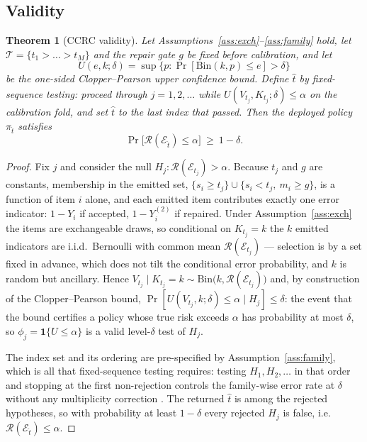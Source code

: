 \documentclass[review,number,doubleblind]{elsarticle}
\theoremstyle{plain}
\newtheorem{theorem}{Theorem}
\theoremstyle{definition}
\theoremstyle{remark}
\newcommand{\Risk}{\mathcal{R}}
\newcommand{\emit}{\mathcal{E}}
\begin{document}
\subsection{Validity}
\label{sec:validity}

\begin{theorem}[CCRC validity]
\label{thm:validity}
Let Assumptions~\ref{ass:exch}--\ref{ass:family} hold, let $\mathcal{T}=\{t_1>\dots>t_M\}$
and the repair gate $g$ be fixed before calibration, and let
\[
U(e,k;\delta)=\sup\{p:\Pr[\mathrm{Bin}(k,p)\le e]>\delta\}
\]
be the one-sided Clopper--Pearson upper confidence bound. Define
$\hat t$ by fixed-sequence testing: proceed through $j=1,2,\dots$ while
$U(V_{t_j},K_{t_j};\delta)\le\alpha$ on the calibration fold, and set
$\hat t$ to the last index that passed. Then the deployed policy
$\pi_{\hat t}$ satisfies
\[
\Pr\bigl[\Risk(\emit_{\hat t})\le\alpha\bigr]\ \ge\ 1-\delta .
\]
\end{theorem}

\begin{proof}
Fix $j$ and consider the null $H_j:\Risk(\emit_{t_j})>\alpha$. Because $t_j$ and $g$ are
constants, membership in the emitted set,
$\{s_i\ge t_j\}\cup\{s_i<t_j,\ m_i\ge g\}$, is a function of item $i$ alone, and each emitted
item contributes exactly one error indicator: $1-Y_i$ if accepted, $1-Y^{(2)}_i$ if repaired.
Under Assumption~\ref{ass:exch} the items are exchangeable draws, so conditional on
$K_{t_j}=k$ the $k$ emitted indicators are i.i.d.\ Bernoulli with common mean
$\Risk(\emit_{t_j})$ --- selection is by a set fixed in advance, which does not tilt the
conditional error probability, and $k$ is random but ancillary. Hence
$V_{t_j}\mid K_{t_j}=k\sim\mathrm{Bin}\bigl(k,\Risk(\emit_{t_j})\bigr)$ and, by construction of
the Clopper--Pearson bound, $\Pr[U(V_{t_j},k;\delta)\le\alpha\mid H_j]\le\delta$: the event
that the bound certifies a policy whose true risk exceeds $\alpha$ has probability at most
$\delta$, so $\phi_j=\mathbf{1}\{U\le\alpha\}$ is a valid level-$\delta$ test of $H_j$.

The index set and its ordering are pre-specified by Assumption~\ref{ass:family}, which is all
that fixed-sequence testing requires: testing $H_1,H_2,\dots$ in that order and stopping at
the first non-rejection controls the family-wise error rate at $\delta$ without any
multiplicity correction \citep{angelopoulos2021ltt}. The returned $\hat t$ is among the
rejected hypotheses, so with probability at least $1-\delta$ every rejected $H_j$ is false,
i.e.\ $\Risk(\emit_{\hat t})\le\alpha$.
\end{proof}
\end{document}
